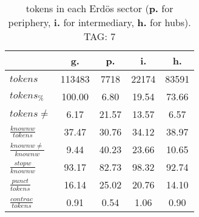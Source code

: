 \begin{table}[h!]
\begin{center}
\begin{tabular}{| l | c | c | c | c |}\hline
 & g. & p. & i. & h. \\\hline
$tokens$ & 113483  & 7718  & 22174  & 83591 \\\hline
$tokens_{\%}$ & 100.00  & 6.80  & 19.54  & 73.66 \\\hline
$tokens \neq$ & 6.17  & 21.57  & 13.57  & 6.57 \\\hline
$\frac{knownw}{tokens}$ & 37.47  & 30.76  & 34.12  & 38.97 \\\hline
$\frac{knownw \neq}{knownw}$ & 9.44  & 40.23  & 23.66  & 10.65 \\\hline
$\frac{stopw}{knownw}$ & 93.17  & 82.73  & 98.32  & 92.74 \\\hline
$\frac{punct}{tokens}$ & 16.14  & 25.02  & 20.76  & 14.10 \\\hline
$\frac{contrac}{tokens}$ & 0.91  & 0.54  & 1.06  & 0.90 \\\hline
\end{tabular}
\caption{tokens in each Erd\"os sector ({{\bf p.}} for periphery, {{\bf i.}} for intermediary, 
    {{\bf h.}} for hubs). TAG: 7}
\end{center}
\end{table}